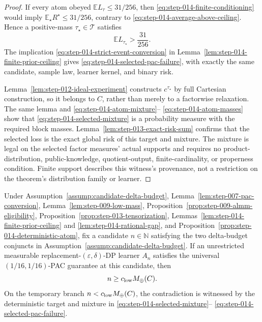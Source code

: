\begin{proof}
If every atom obeyed
\(\mathbb E L_\tau\le31/256\), then
\eqref{eq:step-014-finite-conditioning} would imply
\(\mathbb E_\star R^\star\le31/256\), contrary to
\eqref{eq:step-014-average-above-ceiling}.  Hence a positive-mass
\(\tau_\star\in\mathcal T\) satisfies
\begin{equation}\label{eq:step-014-selected-expectation}
\mathbb E L_{\tau_\star}>\frac{31}{256}.
\end{equation}
The implication \eqref{eq:step-014-strict-event-conversion} in
Lemma~\ref{lem:step-014-finite-prior-ceiling} gives
\eqref{eq:step-014-selected-pac-failure}, with exactly the same
candidate, sample law, learner kernel, and binary risk.

Lemma~\ref{lem:step-012-ideal-experiment} constructs
\(c^{\tau_\star}\) by full Cartesian construction, so it belongs to
\(C\), rather than merely to a factorwise relaxation.  The same lemma
and \eqref{eq:step-014-atom-mixture}--%
\eqref{eq:step-014-atom-masses} show that
\eqref{eq:step-014-selected-mixture} is a probability measure with the
required block masses.  Lemma~\ref{lem:step-013-exact-risk-sum}
confirms that the selected loss is the exact global risk of this target
and mixture.  The mixture is legal on the selected factor measures'
actual supports and requires no product-distribution, public-knowledge,
quotient-output, finite-cardinality, or properness condition.  Finite
support describes this witness's provenance, not a restriction on the
theorem's distribution family or learner.
\end{proof}

\begin{proposition}
\label{prop:step-014-candidate-closure}
Under Assumption~\ref{assump:candidate-delta-budget},
Lemma~\ref{lem:step-007-pac-conversion},
Lemma~\ref{lem:step-009-low-mass},
Proposition~\ref{prop:step-009-almm-eligibility},
Proposition~\ref{prop:step-013-tensorization},
Lemmas~\ref{lem:step-014-finite-prior-ceiling} and
\ref{lem:step-014-rational-gap}, and
Proposition~\ref{prop:step-014-deterministic-atom}, fix a candidate
\(n\in\mathbb N\) satisfying the two delta-budget conjuncts in
Assumption~\ref{assump:candidate-delta-budget}.  If an unrestricted
measurable replacement-\((\varepsilon,\delta)\)-DP learner \(A_n\)
satisfies the universal \((1/16,1/16)\)-PAC guarantee at this candidate,
then
\begin{equation}\label{eq:step-014-candidate-lower}
n\ge c_{\rm low}M_{\oplus}(C).
\end{equation}
On the temporary branch
\(n<c_{\rm low}M_{\oplus}(C)\), the contradiction is witnessed by the
deterministic target and mixture in
\eqref{eq:step-014-selected-mixture}--%
\eqref{eq:step-014-selected-pac-failure}.
\end{proposition}

